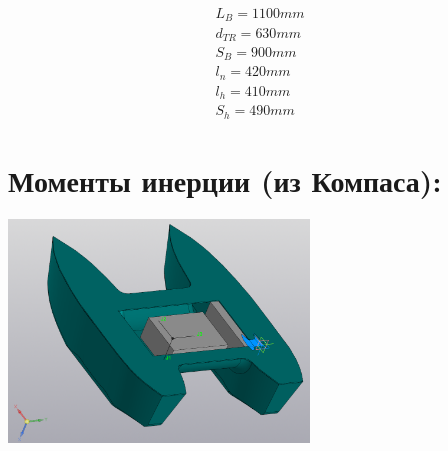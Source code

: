 \begin{eqnarray*}
    L_B = 1100 mm \\
    d_{TR} = 630 mm \\
    S_B = 900 mm \\
    l_n = 420 mm \\
    l_h = 410 mm \\
    S_h = 490 mm
\end{eqnarray*}

\newpage

\section*{Моменты инерции (из Компаса):}

\begin{center}
        \includegraphics[width=0.6\textwidth]{img/Moments.PNG}\\
\end{center} 

